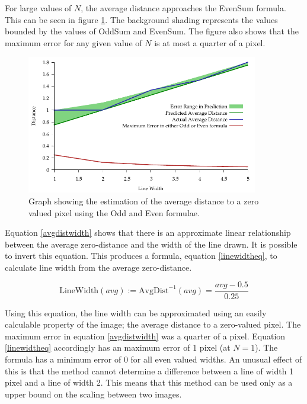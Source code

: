 \documentclass[../main.tex]{subfiles}
\begin{document}
    For large values of $N$, the average distance approaches the EvenSum formula.
    This can be seen in figure \ref{oddevenwidth}.
    The background shading represents the values bounded by the values of OddSum and EvenSum.
    The figure also shows that the maximum error for any given value of $N$ is at most a quarter of a pixel.

    \begin{figure}[H]
      \centering
      \includegraphics[width=0.9\textwidth]{graphs/oddevenwidth.pdf}
      \caption[
        Relationship between line width and mean zero-distance 
      ]{Graph showing the estimation of the average distance to a zero valued pixel using the Odd and Even formulae.}
      \label{oddevenwidth}
    \end{figure}

    Equation \ref{avgdistwidth} shows that there is an approximate linear relationship between the average zero-distance and the width of the line drawn.
    It is possible to invert this equation.
    This produces a formula, equation \ref{linewidtheq}, to calculate line width from the average zero-distance.

    \begin{equation}
      \text{LineWidth}(avg) := \text{AvgDist}^{-1}(avg) = \frac{avg-0.5}{0.25}
      \label{linewidtheq}
    \end{equation}

    Using this equation, the line width can be approximated using an easily calculable property of the image; the average distance to a zero-valued pixel.
    The maximum error in equation \ref{avgdistwidth} was a quarter of a pixel.
    Equation \ref{linewidtheq} accordingly has an maximum error of 1 pixel (at $N=1$).
    The formula has a minimum error of 0 for all even valued widths.
    An unusual effect of this is that the method cannot determine a difference between a line of width 1 pixel and a line of width 2.
    This means that this method can be used only as a upper bound on the scaling between two images.
\end{document}
